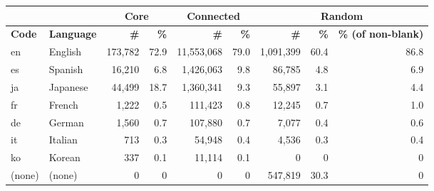 \begin{tabular}{| l | l |  r | r | r | r | r | r | r |}
\hline
& & \multicolumn{2}{|c|}{\textbf{Core}} & \multicolumn{2}{|c|}{\textbf{Connected}} & \multicolumn{3}{|c|}{\textbf{Random}} \\ \hline
\textbf{Code} & \textbf{Language} & \textbf{\#} & \textbf{\%} & \textbf{\#} & \textbf{\%} & \textbf{\#} & \textbf{\%} & \textbf{\% (of non-blank)} \\ \hline
en & English & 173,782 & 72.9 & 11,553,068 & 79.0 & 1,091,399 & 60.4 & 86.8 \\ \hline
es & Spanish & 16,210 & 6.8 & 1,426,063 & 9.8 & 86,785 & 4.8 & 6.9 \\ \hline
ja & Japanese & 44,499 & 18.7 & 1,360,341 & 9.3 & 55,897 & 3.1 & 4.4 \\ \hline
fr & French & 1,222 & 0.5 & 111,423 & 0.8 & 12,245 & 0.7 & 1.0 \\ \hline
de & German & 1,560 & 0.7 & 107,880 & 0.7 & 7,077 & 0.4 & 0.6 \\ \hline
it & Italian & 713 & 0.3 & 54,948 &  0.4 & 4,536 & 0.3 & 0.4 \\ \hline
ko & Korean & 337 & 0.1 & 11,114 & 0.1 & 0 & 0 & 0 \\ \hline
(none) & (none) & 0 & 0 & 0 & 0 & 547,819 & 30.3 & 0 \\ \hline
\end{tabular}

